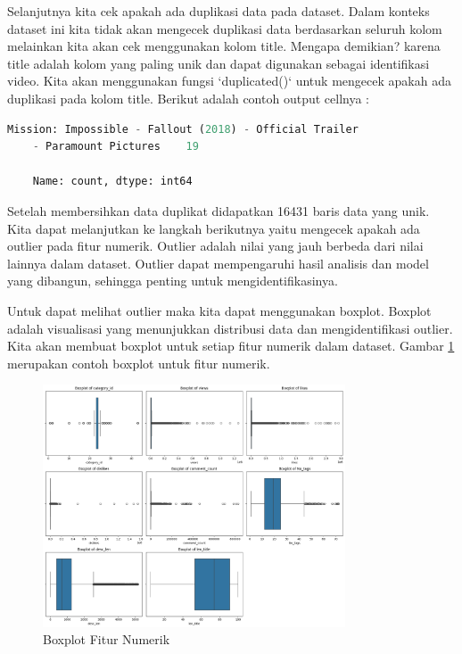 Selanjutnya kita cek apakah ada duplikasi data pada dataset. Dalam konteks dataset ini kita tidak akan mengecek duplikasi data berdasarkan seluruh kolom melainkan kita akan cek menggunakan kolom title. Mengapa demikian? karena title adalah kolom yang paling unik dan dapat digunakan sebagai identifikasi video. Kita akan menggunakan fungsi `duplicated()` untuk mengecek apakah ada duplikasi pada kolom title. Berikut adalah contoh output cellnya :



\begin{lstlisting}[language=Python, caption=Cek Duplikasi Data]
    Mission: Impossible - Fallout (2018) - Official Trailer 
    - Paramount Pictures    19

    Name: count, dtype: int64
\end{lstlisting}

Setelah membersihkan data duplikat didapatkan 16431 baris data yang unik. Kita dapat melanjutkan ke langkah berikutnya yaitu mengecek apakah ada outlier pada fitur numerik. Outlier adalah nilai yang jauh berbeda dari nilai lainnya dalam dataset. Outlier dapat mempengaruhi hasil analisis dan model yang dibangun, sehingga penting untuk mengidentifikasinya.

Untuk dapat melihat outlier maka kita dapat menggunakan boxplot. Boxplot adalah visualisasi yang menunjukkan distribusi data dan mengidentifikasi outlier. Kita akan membuat boxplot untuk setiap fitur numerik dalam dataset. Gambar \ref{fig:boxplot_fitur_numerik} merupakan contoh boxplot untuk fitur numerik.

\begin{figure}[ht]
    \centering
    \includegraphics[width=0.8\textwidth]{gambar/boxplot1.png}
    \caption{Boxplot Fitur Numerik}
    \label{fig:boxplot_fitur_numerik}
\end{figure}

